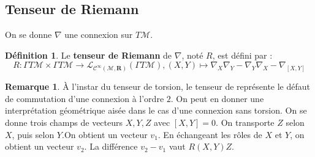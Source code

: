 \documentclass[12pt,a4paper]{article}
\theoremstyle{definition}
\newtheorem{defn}[thm]{Définition}
\newtheorem{rqe}[thm]{Remarque}
\begin{document}
\subsection{Tenseur de Riemann}
On se donne $\nabla$ une connexion sur $T\mathcal{M}$.
\begin{defn}
Le \textbf{tenseur de Riemann} de $\nabla$, noté $R$, est défini par :
$$
R:\Gamma T\mathcal{M}\times \Gamma T\mathcal{M}\to\mathcal{L}_{\mathcal{C}^\infty(\mathcal{M},\mathbf{R})}(\Gamma T\mathcal{M}),(X,Y)\mapsto \nabla_X\nabla_Y-\nabla_Y\nabla_X-\nabla_{[X,Y]}
$$
\end{defn}
\begin{rqe}
À l'instar du tenseur de torsion, le tenseur de  représente le défaut de commutation d'une connexion à l'ordre $2$. On peut en donner une interprétation géométrique aisée dans le cas d'une connexion sans torsion. On se donne trois champs de vecteurs $X,Y,Z$ avec $[X,Y]=0$. On transporte $Z$ selon $X$, puis selon $Y$.\newline On obtient un vecteur $v_1$. En échangeant les rôles de $X$ et $Y$, on obtient un vecteur $v_2$. La différence $v_2-v_1$ vaut $R(X,Y)Z$.
\end{rqe}
\end{document}
